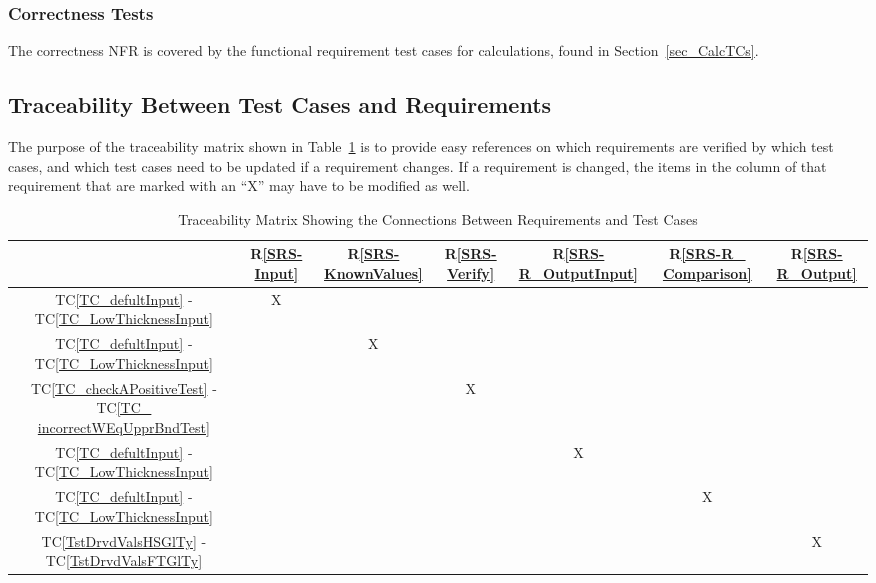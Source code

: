 \documentclass[12pt, titlepage]{article}
\newcommand{\rref}[1]{R\ref{#1}}
\newcommand{\tcref}[1]{TC\ref{#1}}
\newcommand{\progname}{GlassBR}
\begin{document}
\subsubsection{Correctness Tests}
The correctness NFR is covered by the functional requirement test cases for 
calculations, found in 
Section~\ref{sec_CalcTCs}.

\subsection{Traceability Between Test Cases and Requirements}

\noindent The purpose of the traceability matrix shown in 
Table~\ref{Table:T_trace} is to provide easy 
references on which requirements are verified by which test cases, and which 
test cases need to be updated if a requirement changes.  If a requirement is 
changed, the items in the column of that requirement that are marked
with an ``X'' may have to be modified as well. 

\begin{table}[!h]
	\centering
	\begin{tabular}{|c|c|c|c|c|c|c|}
		\hline
		& \rref{SRS-Input}& \rref{SRS-KnownValues}& \rref{SRS-Verify}& \rref{SRS-R_OutputInput}& 
		\rref{SRS-R_ Comparison}& \rref{SRS-R_Output}\\
		\hline
		\tcref{TC_defultInput} - \tcref{TC_LowThicknessInput}                 
		& X& & & & &  \\ \hline
		\tcref{TC_defultInput} - \tcref{TC_LowThicknessInput}                 
		& &X & & & &  \\ \hline
		\tcref{TC_checkAPositiveTest} - \tcref{TC_ incorrectWEqUpprBndTest} 
		& & & X& & & \\ \hline
		\tcref{TC_defultInput} - \tcref{TC_LowThicknessInput}                             
		& & & &X& &   \\ \hline
		\tcref{TC_defultInput} - \tcref{TC_LowThicknessInput}                              
		& & & & &X &   \\ \hline
		\tcref{TstDrvdValsHSGlTy} - \tcref{TstDrvdValsFTGlTy}                                                
		& & & & & &X  \\ \hline
		
		\hline
	\end{tabular}
	\caption{Traceability Matrix Showing the Connections Between Requirements 
	and Test Cases}
	\label{Table:T_trace}
\end{table}

%
\end{document}
